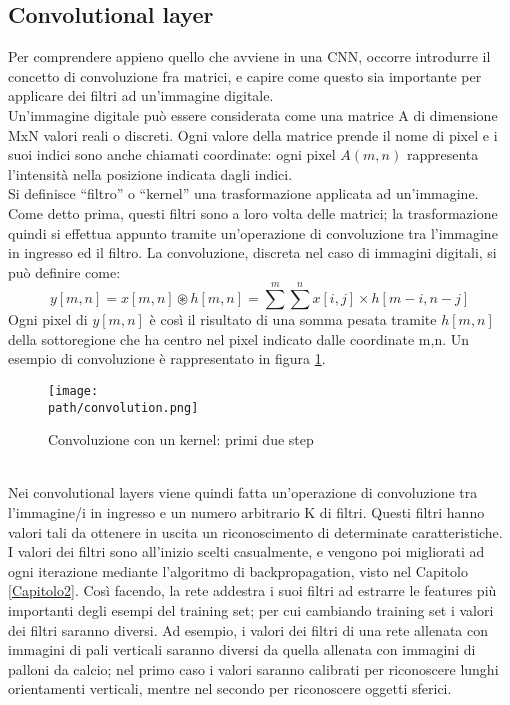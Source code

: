 \subsection{Convolutional layer}
Per comprendere appieno quello che avviene in una CNN, occorre introdurre il concetto di convoluzione fra matrici, e capire come questo sia importante per applicare dei filtri ad un'immagine digitale.
\\
Un’immagine digitale può essere considerata come una matrice A di dimensione MxN valori reali o discreti. Ogni valore della matrice prende il nome di pixel e i suoi indici sono anche chiamati coordinate: ogni pixel $A(m,n)$ rappresenta l’intensità nella posizione indicata dagli indici. \\ 
Si definisce “filtro” o “kernel” una trasformazione applicata ad un’immagine. Come detto prima, questi filtri sono a loro volta delle matrici; la trasformazione quindi si effettua appunto tramite un'operazione di convoluzione tra l'immagine in ingresso ed il filtro.
La convoluzione, discreta nel caso di immagini digitali, si può definire come: 
$$
y[m,n] = x[m,n] \circledast h[m,n] = \sum^{m}\sum^{n}x[i,j]\times h[m-i,n-j]
$$
Ogni pixel di $y[m,n]$ è così il risultato di una somma pesata tramite $h[m,n]$ della sottoregione che ha centro nel pixel indicato dalle coordinate m,n. Un esempio di convoluzione è rappresentato in figura \ref{fig:convolution}. 
\begin{figure}[h!]
 \centering
 \texttt{[image: \\path/convolution.png]} 
 \caption{Convoluzione con un kernel: primi due step}
 \label{fig:convolution}
\end{figure}
\\
Nei convolutional layers viene quindi fatta un'operazione di convoluzione tra l'immagine/i in ingresso
e un numero arbitrario K di filtri. Questi filtri hanno valori tali da ottenere in uscita un riconoscimento di determinate caratteristiche. \\
I valori dei filtri sono all'inizio scelti casualmente, e vengono poi migliorati ad ogni iterazione mediante l'algoritmo di backpropagation, visto nel Capitolo \ref{Capitolo2}. Così facendo, la rete addestra i suoi filtri ad estrarre le features più importanti degli esempi del training set; per cui cambiando training set i valori dei
filtri saranno diversi.
Ad esempio, i valori dei filtri di una rete allenata con immagini di pali verticali saranno diversi da quella allenata con immagini di palloni da calcio; nel primo caso i valori saranno calibrati per riconoscere lunghi orientamenti verticali, mentre
nel secondo per riconoscere oggetti sferici. 

